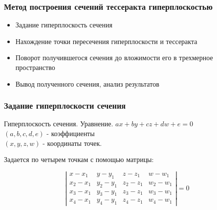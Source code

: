 \documentclass[10pt,pdf,hyperref={unicode}]{beamer}
\begin{document}
\begin{frame}
\begin{columns}
	\end{columns}
\end{frame}
\begin{frame}
	\frametitle{Метод построения сечений тессеракта гиперплоскостью}
	\begin{itemize}
		\item Задание гиперплоскость сечения
		\item Нахождение точки пересечения гиперплоскости и тессеракта
		\item Поворот получившегося сечения до вложимости его в трехмерное пространство
		\item Вывод полученного сечения, анализ результатов
	\end{itemize}
\end{frame}
\begin{frame}
	\frametitle{Задание гиперплоскости сечения}
	\begin{block}{Гиперплоскость сечения. Уравнение.}
		{\bfseries $ax+by+cz+dw+e=0$} \\ $(a,b,c,d,e)$ - коэффициенты\\  $(x,y,z,w)$ - координаты точек.
	\end{block}
	Задается по четырем точкам с помощью матрицы: \\

	\begin{flushleft}
	$$ \left|
	\begin{array}{cccc}
		x-x_1 & y-y_1 & z-z_1 & w-w_1     \\
		x_2-x_1 & y_2-y_1 & z_2-z_1 & w_2-w_1    \\
		x_3-x_1 & y_3-y_1 & z_3-z_1 & w_3-w_1      \\
		x_4-x_1 & y_4-y_1 & z_4-z_1 & w_4-w_1 
	\end{array}
	\right|=0
	$$
\end{flushleft}

\end{frame}
\end{document}
